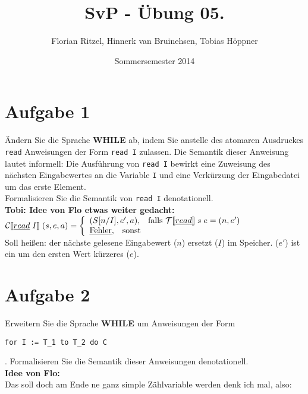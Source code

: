 \documentclass[ngerman,a4paper]{report}
\author{Florian Ritzel, Hinnerk van Bruinehsen, Tobias Höppner}
\title{SvP - Übung 05. }
\date{Sommersemester 2014}
\renewcommand{\maketitle}{}
\begin{document}
\maketitle
\section*{Aufgabe 1}
Ändern Sie die Sprache \textbf{WHILE} ab, indem Sie anstelle des atomaren Ausdruckes \lstinline!read! Anweisungen der Form \lstinline!read I! zulassen. Die Semantik dieser Anweisung lautet informell: Die Ausführung von \lstinline!read I! bewirkt eine Zuweisung des nächsten Eingabewertes an die Variable \lstinline!I! und eine Verkürzung der Eingabedatei um das erste Element.\\
Formalisieren Sie die Semantik von \lstinline!read I! denotationell.\\

%
\textbf{Tobi: Idee von Flo etwas weiter gedacht:}\\
$		\mathcal{C}
[\![\underline{read}\;I]\!]\;(s,e,a) = \left\lbrace\begin{array}{l l} (S[n/I], e', a)\text{,}\quad\text{falls }\mathcal{T}
[\![\underline{read}]\!]\;s\;e = (n, e')\\
		\underline{\text{Fehler}}\text{,}\quad\text{sonst} \end{array}\right.$\\
Soll heißen: der nächste gelesene Eingabewert ($n$) ersetzt ($I$) im Speicher. ($e'$) ist ein um den ersten Wert kürzeres ($e$).\\
\section*{Aufgabe 2}
Erweitern Sie die Sprache \textbf{WHILE} um Anweisungen der Form
\begin{lstlisting}
for I := T_1 to T_2 do C
\end{lstlisting}.
Formalisieren Sie die Semantik dieser Anweisungen denotationell.\\

\textbf{Idee von Flo:}\\

Das soll doch am Ende ne ganz simple Zählvariable werden denk ich mal, also:\\
\end{document}
